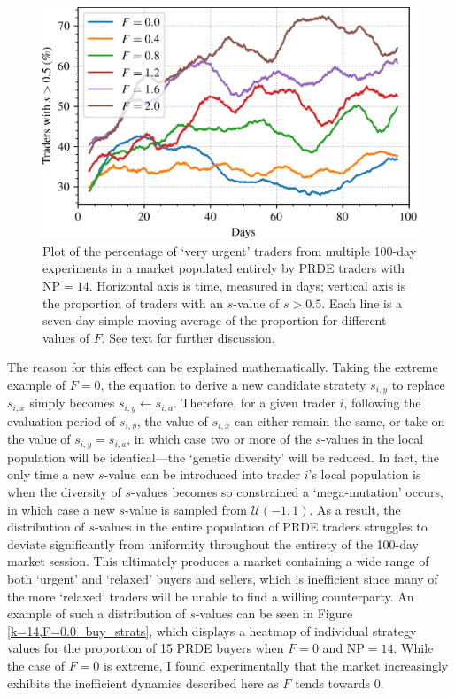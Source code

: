\documentclass[conference]{IEEEtran}
\begin{document}
\begin{figure}[htbp]
    \centerline{\includegraphics[width=\columnwidth]{k=14_strats.png}}
    \caption{
        Plot of the percentage of `very urgent' traders from multiple 100-day experiments in a market populated entirely by PRDE traders with $\mathrm{NP}=14$.
        Horizontal axis is time, measured in days; vertical axis is the proportion of traders with an $s$-value of $s>0.5$.
        Each line is a seven-day simple moving average of the proportion for different values of $F$.
        See text for further discussion.
    }
    \label{k=14_strats}
\end{figure}

The reason for this effect can be explained mathematically.
Taking the extreme example of $F=0$, the equation to derive a new candidate stratety $s_{i,y}$ to replace $s_{i,x}$ simply becomes $s_{i,y}\leftarrow s_{i,a}$.
Therefore, for a given trader $i$, following the evaluation period of $s_{i,y}$, the value of $s_{i,x}$ can either remain the same, or take on the value of $s_{i,y}=s_{i,a}$, in which case two or more of the $s$-values in the local population will be identical---the `genetic diversity' will be reduced.
In fact, the only time a new $s$-value can be introduced into trader $i$'s local population is when the diversity of $s$-values becomes so constrained a `mega-mutation' occurs, in which case a new $s$-value is sampled from $\mathcal{U}(-1,1)$.
As a result, the distribution of $s$-values in the entire population of PRDE traders struggles to deviate significantly from uniformity throughout the entirety of the 100-day market session.
This ultimately produces a market containing a wide range of both `urgent' and `relaxed' buyers and sellers, which is inefficient since many of the more `relaxed' traders will be unable to find a willing counterparty.
An example of such a distribution of $s$-values can be seen in Figure \ref{k=14,F=0.0_buy_strats}, which displays a heatmap of individual strategy values for the proportion of 15 PRDE buyers when $F=0$ and $\mathrm{NP}=14$.
While the case of $F=0$ is extreme, I found experimentally that the market increasingly exhibits the inefficient dynamics described here as $F$ tends towards $0$.
\end{document}
